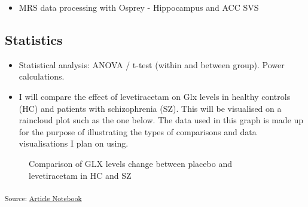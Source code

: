 \documentclass[
  letterpaper,
  DIV=11,
  numbers=noendperiod]{scrartcl}
\providecommand{\tightlist}{%
  \setlength{\itemsep}{0pt}\setlength{\parskip}{0pt}}\usepackage{longtable,booktabs,array}
\begin{document}
\begin{itemize}
\tightlist
\item
  MRS data processing with Osprey - Hippocampus and ACC SVS
\end{itemize}

\subsection{Statistics}\label{statistics}

\begin{itemize}
\tightlist
\item
  Statistical analysis: ANOVA / t-test (within and between group). Power
  calculations.
\item
  I will compare the effect of levetiracetam on Glx levels in healthy
  controls (HC) and patients with schizophrenia (SZ). This will be
  visualised on a raincloud plot such as the one below. The data used in
  this graph is made up for the purpose of illustrating the types of
  comparisons and data visualisations I plan on using.
\end{itemize}

\label{cell-fig-lev_hc_vs_sz}
\begin{figure}[H]


\caption{\label{fig-lev_hc_vs_sz}Comparison of GLX levels change between
placebo and levetiracetam in HC and SZ}

\end{figure}%

\textsubscript{Source:
\href{https://juliam98.github.io/phd-upgrade-proposal/index.qmd.html}{Article
Notebook}}
\end{document}
